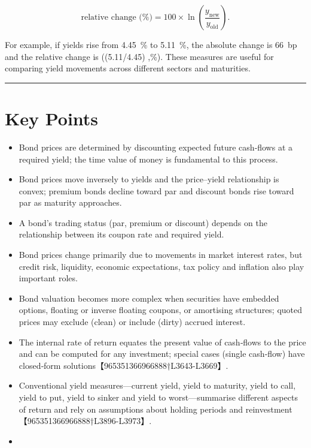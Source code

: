 \documentclass[
  letterpaper,
  DIV=11,
  numbers=noendperiod]{scrartcl}
\providecommand{\tightlist}{%
  \setlength{\itemsep}{0pt}\setlength{\parskip}{0pt}}
\begin{document}
\[
\text{relative change (\%)} = 100 \times \ln\left(\frac{y_{\text{new}}}{y_{\text{old}}}\right).
\]

For example, if yields rise from 4.45~\% to 5.11~\%, the absolute change
is 66~bp and the relative change is (\ln(5.11/4.45) 
,\%). These measures are useful for comparing yield
movements across different sectors and maturities.

\begin{center}\rule{0.5\linewidth}{0.5pt}\end{center}

\section{Key Points}\label{key-points}

\begin{itemize}
\tightlist
\item
  Bond prices are determined by discounting expected future cash‑flows
  at a required yield; the time value of money is fundamental to this
  process.
\item
  Bond prices move inversely to yields and the price--yield relationship
  is convex; premium bonds decline toward par and discount bonds rise
  toward par as maturity approaches.
\item
  A bond's trading status (par, premium or discount) depends on the
  relationship between its coupon rate and required yield.
\item
  Bond prices change primarily due to movements in market interest
  rates, but credit risk, liquidity, economic expectations, tax policy
  and inflation also play important roles.
\item
  Bond valuation becomes more complex when securities have embedded
  options, floating or inverse floating coupons, or amortising
  structures; quoted prices may exclude (clean) or include (dirty)
  accrued interest.
\item
  The internal rate of return equates the present value of cash‑flows to
  the price and can be computed for any investment; special cases
  (single cash‑flow) have closed‑form
  solutions【965351366966888†L3643-L3669】.
\item
  Conventional yield measures---current yield, yield to maturity, yield
  to call, yield to put, yield to sinker and yield to worst---summarise
  different aspects of return and rely on assumptions about holding
  periods and reinvestment【965351366966888†L3896-L3973】.
\item

\end{itemize}
\end{document}
